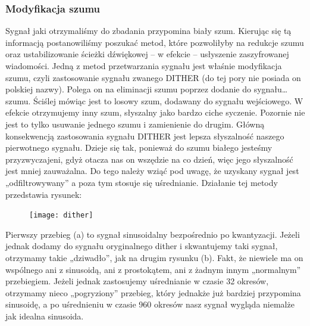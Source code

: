 \documentclass[a4paper,titleauthor]{mwart}
\begin{document}
	\subsubsection{Modyfikacja szumu}
	
	Sygnał jaki otrzymaliśmy do zbadania przypomina biały szum.\newline \newline
	Kierując się tą informacją postanowiliśmy poszukać metod, które pozwoliłyby na redukcje szumu oraz ustabilizowanie ścieżki dźwiękowej – w efekcie – usłyszenie zaszyfrowanej wiadomości. 
	\newline \newline
	Jedną z metod przetwarzania sygnału jest właśnie modyfikacja szumu, czyli zastosowanie sygnału zwanego DITHER (do tej pory nie posiada on polskiej nazwy). Polega on na eliminacji szumu poprzez dodanie do sygnału… szumu. Ściślej mówiąc jest to losowy szum, dodawany do sygnału wejściowego. W efekcie otrzymujemy inny szum, słyszalny jako bardzo ciche syczenie.\newline \newline
	Pozornie nie jest to tylko usuwanie jednego szumu i zamienienie do drugim. Główną konsekwencją zastosowania sygnału DITHER jest lepsza słyszalność naszego pierwotnego sygnału. Dzieje się tak, ponieważ do szumu białego jesteśmy przyzwyczajeni, gdyż otacza nas on wszędzie na co dzień, więc jego słyszalność jest mniej zauważalna. Do tego należy wziąć pod uwagę, że uzyskany sygnał jest „odfiltrowywany” a poza tym stosuje się uśrednianie. 
	\newline \newline
	Działanie tej metody przedstawia rysunek: 
	
	\begin{figure}[h]
		\centering
		\texttt{[image: dither]}
	\end{figure}
	
	Pierwszy przebieg (a) to sygnał sinusoidalny bezpośrednio po kwantyzacji. Jeżeli jednak dodamy do sygnału oryginalnego dither i skwantujemy taki sygnał, otrzymamy takie „dziwadło”, jak na drugim rysunku (b). \newline \newline
	Fakt, że niewiele ma on wspólnego ani z sinusoidą, ani z prostokątem, ani z żadnym innym „normalnym” przebiegiem. Jeżeli jednak zastosujemy uśrednianie w czasie 32 okresów, otrzymamy nieco „pogryziony” przebieg, który jednakże już bardziej przypomina sinusoidę, a po uśrednieniu w czasie 960 okresów nasz sygnał wygląda niemalże jak idealna sinusoida.   
	
\end{document}
